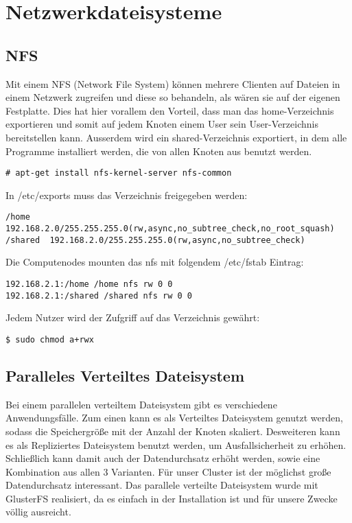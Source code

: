 \chapter{Netzwerkdateisysteme}
\section{NFS}
Mit einem NFS (Network File System) können mehrere Clienten auf Dateien
in einem Netzwerk zugreifen und diese so behandeln, als wären sie
auf der eigenen Festplatte.
Dies hat hier vorallem den Vorteil, dass man das home-Verzeichnis
exportieren und somit auf jedem Knoten einem User sein User-Verzeichnis
bereitstellen kann. Ausserdem wird ein shared-Verzeichnis exportiert, in dem 
alle Programme installiert werden, die von allen Knoten aus benutzt werden.
\begin{lstlisting}[style=Bash]
# apt-get install nfs-kernel-server nfs-common
\end{lstlisting}
In /etc/exports muss das Verzeichnis freigegeben werden:
\begin{lstlisting}[style=Bash,basicstyle=\small]
/home    192.168.2.0/255.255.255.0(rw,async,no_subtree_check,no_root_squash)
/shared  192.168.2.0/255.255.255.0(rw,async,no_subtree_check)
\end{lstlisting}
Die Computenodes mounten das nfs mit folgendem /etc/fstab Eintrag:
\begin{lstlisting}[style=Bash]
192.168.2.1:/home /home nfs rw 0 0
192.168.2.1:/shared /shared nfs rw 0 0
\end{lstlisting}
Jedem Nutzer wird der Zufgriff auf das Verzeichnis gewährt:
\begin{lstlisting}[style=Bash]
$ sudo chmod a+rwx
\end{lstlisting}
\section{Paralleles Verteiltes Dateisystem}
Bei einem parallelen verteiltem Dateisystem gibt es verschiedene Anwendungsfälle.
Zum einen kann es als Verteiltes Dateisystem genutzt werden,
sodass die Speichergröße mit der Anzahl der Knoten skaliert.
Desweiteren kann es als Repliziertes Dateisystem benutzt werden,
um Ausfallsicherheit zu erhöhen.
Schließlich kann damit auch der Datendurchsatz erhöht werden, sowie eine Kombination aus allen 3 Varianten.
Für unser Cluster ist der möglichst große Datendurchsatz interessant.
Das parallele verteilte Dateisystem wurde mit GlusterFS realisiert,
da es einfach in der Installation ist und für unsere Zwecke völlig ausreicht.\\

